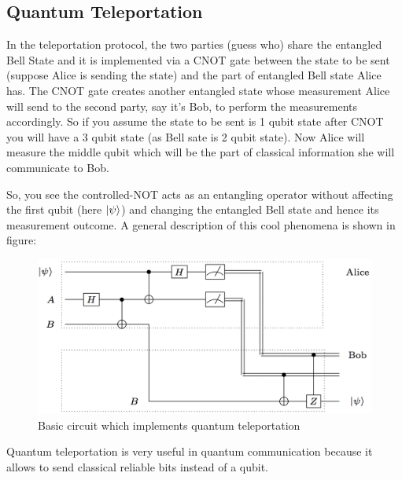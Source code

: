 \subsection*{Quantum Teleportation}
In the teleportation protocol, the two parties (guess who)  share the entangled Bell State and it is implemented via a CNOT gate between the state to be sent (suppose Alice is sending the state) and the part of entangled Bell state Alice has. The CNOT gate creates another entangled state whose measurement Alice will send to the second party, say it's Bob, to perform the measurements accordingly. So if you assume the state to be sent is 1 qubit state after CNOT you will have a 3 qubit state (as Bell sate is 2 qubit state). Now Alice will measure the middle qubit which will be the part of classical information she will communicate to Bob.

So, you see the controlled-NOT acts as an entangling operator without affecting the first qubit (here $\ket{\psi}$) and changing the entangled Bell state and hence its measurement outcome.
A general description of this cool phenomena is shown in figure: 
\begin{figure}[h!]
    \centering
    \includegraphics[width=\textwidth]{Mainmatter/images/teleportation-circuit.png}
    \caption{Basic circuit which implements quantum teleportation}
    \label{fig:teleportation}
\end{figure}
Quantum teleportation is very useful in quantum communication because it allows to send classical reliable bits instead of a qubit.